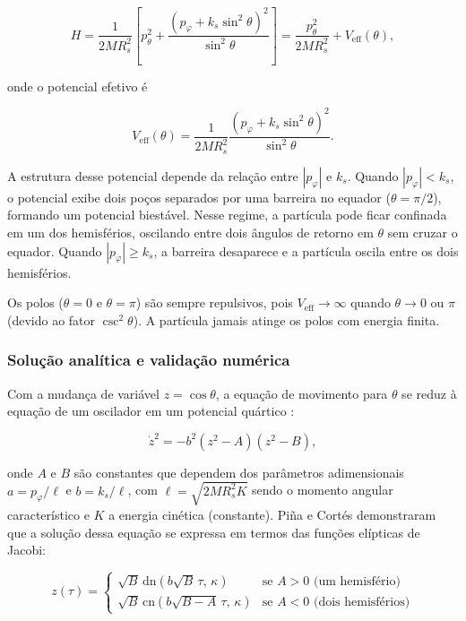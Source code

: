\documentclass[twocolumn]{rbef}
\begin{document}
\begin{equation}\label{hamSfera}
    H = \dfrac{1}{2MR_s^2}\left[p_\theta^2 + \dfrac{\left(p_\varphi + k_s\sin^2\theta\right)^2}{\sin^2\theta}\right] = \dfrac{p_\theta^2}{2MR_s^2} + V_{\text{eff}}(\theta),
\end{equation}

\noindent onde o potencial efetivo é

\begin{equation}\label{veffSfera}
    V_{\text{eff}}(\theta) = \dfrac{1}{2MR_s^2}\dfrac{\left(p_\varphi + k_s\sin^2\theta\right)^2}{\sin^2\theta}.
\end{equation}

A estrutura desse potencial depende da relação entre $|p_\varphi|$ e $k_s$. Quando $|p_\varphi| < k_s$, o potencial exibe dois poços separados por uma barreira no equador ($\theta = \pi/2$), formando um potencial biestável. Nesse regime, a partícula pode ficar confinada em um dos hemisférios, oscilando entre dois ângulos de retorno em $\theta$ sem cruzar o equador. Quando $|p_\varphi| \geq k_s$, a barreira desaparece e a partícula oscila entre os dois hemisférios.

Os polos ($\theta = 0$ e $\theta = \pi$) são sempre repulsivos, pois $V_{\text{eff}} \to \infty$ quando $\theta \to 0$ ou $\pi$ (devido ao fator $\csc^2\theta$). A partícula jamais atinge os polos com energia finita.

\subsubsection{Solução analítica e validação numérica}

Com a mudança de variável $z = \cos\theta$, a equação de movimento para $\theta$ se reduz à equação de um oscilador em um potencial quártico \cite{PinaCortesElliptic}:

\begin{equation}\label{quartico}
    \dot{z}^2 = -b^2(z^2 - A)(z^2 - B),
\end{equation}

\noindent onde $A$ e $B$ são constantes que dependem dos parâmetros adimensionais $a = p_\varphi/\ell$ e $b = k_s/\ell$, com $\ell = \sqrt{2MR_s^2 K}$ sendo o momento angular característico e $K$ a energia cinética (constante). Piña e Cortés \cite{PinaCortesElliptic} demonstraram que a solução dessa equação se expressa em termos das funções elípticas de Jacobi:

\begin{equation}\label{solucaoJacobi}
    z(\tau) = \begin{cases}
        \sqrt{B}\,\text{dn}(b\sqrt{B}\,\tau,\,\kappa) & \text{se } A > 0 \text{ (um hemisfério)}\\[6pt]
        \sqrt{B}\,\text{cn}(b\sqrt{B-A}\,\tau,\,\kappa) & \text{se } A < 0 \text{ (dois hemisférios)}
    \end{cases}
\end{equation}
\end{document}
